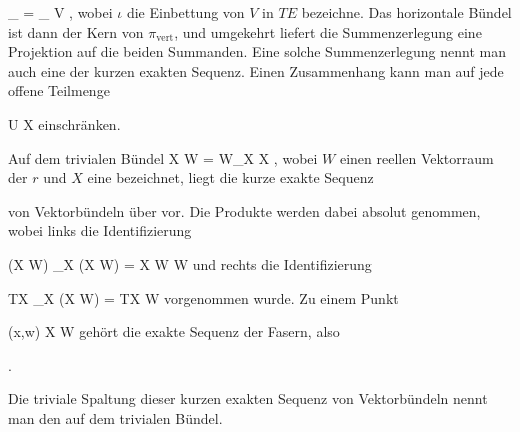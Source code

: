 \mavergleichskettedisp
{\vergleichskette
{ \pi_{ }  \circ \iota
}
{ =} {
_{  V  }
}
{ } {
}
{ } {
}
{ } {
}
}
{}{}{,}
wobei $\iota$ die Einbettung von $V$ in $TE$ bezeichne. Das horizontale Bündel ist dann der Kern von $\pi_{\text{vert} }$, und umgekehrt liefert die Summenzerlegung eine Projektion auf die beiden Summanden. Eine solche Summenzerlegung nennt man auch eine  {} der kurzen exakten Sequenz. Einen Zusammenhang kann man auf jede offene Teilmenge

\mavergleichskette
{\vergleichskette
{ U
}
{ \subseteq }{ X
}
{  }{
}
{    }{
}
{   }{
}
}
{}{}{}
einschränken.

{

Auf dem trivialen Bündel
 {X \times W = W_X } { X
} {,}
wobei $W$ einen reellen Vektorraum der
$r$ und $X$ eine
bezeichnet, liegt  die kurze exakte Sequenz

 {  }

von Vektorbündeln über
 vor. Die Produkte werden dabei absolut genommen, wobei links die Identifizierung

\mavergleichskette
{\vergleichskette
{ (X \times W) \times_X (X \times W)
}
{ = }{ X \times W \times W
}
{  }{
}
{    }{
}
{   }{
}
}
{}{}{}
und rechts die Identifizierung

\mavergleichskette
{\vergleichskette
{ TX \times_X (X \times W)
}
{ = }{ TX \times W
}
{  }{
}
{    }{
}
{   }{
}
}
{}{}{}
vorgenommen wurde. Zu einem Punkt

\mavergleichskette
{\vergleichskette
{ (x,w)
}
{ \in }{ X \times W
}
{  }{
}
{    }{
}
{   }{
}
}
{}{}{}
gehört die exakte Sequenz der Fasern, also

 { . }

Die triviale Spaltung dieser kurzen exakten Sequenz von Vektorbündeln nennt man den  {} auf dem trivialen Bündel.

}


